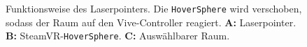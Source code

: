 \begin{figure}[tbh]
    \centering
    \caption{Funktionsweise des Laserpointers. %
        Die \lstinline|HoverSphere| wird verschoben, sodass der Raum auf den Vive-Controller reagiert. %
        \textbf{A:} Laserpointer. \textbf{B:} SteamVR-\lstinline|HoverSphere|. \textbf{C:} Auswählbarer Raum.}
    \label{fig:laserpointer_sketch}
\end{figure}

